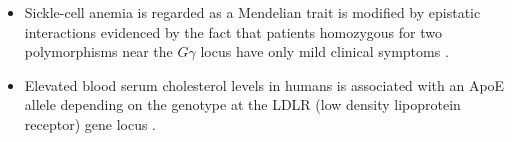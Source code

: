 \begin{itemize}
	\item Sickle-cell anemia is regarded as a Mendelian trait is modified by epistatic interactions evidenced by the fact that patients homozygous for two polymorphisms near the $G\gamma$ locus have only mild clinical symptoms \cite{odenheimer1983heterogeneity}.

	\item Elevated blood serum cholesterol levels in humans is associated with an ApoE allele depending on the genotype at the LDLR (low density lipoprotein receptor) gene locus \cite{pedersen1989interaction}.

\end{itemize}


